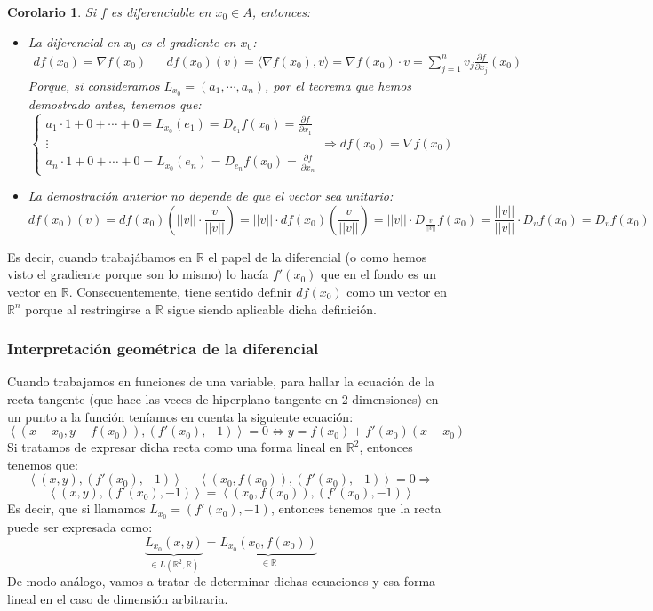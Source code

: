\documentclass[10pt,a4paper,openright]{book}
\theoremstyle{break}
\newtheorem*{coro}{Corolario}
\begin{document}
\begin{coro}
Si $f$ es diferenciable en $x_0\in A$, entonces:
\begin{itemize}
\item La diferencial en $x_0$ es el gradiente en $x_0$:
	\begin{align*}
df(x_0) = \nabla f(x_0)& & df(x_0)(v) = \langle \nabla f(x_0), v\rangle = \nabla f(x_0) \cdot v = \sum_{j = 1}^{n}v_j \frac{\partial f}{\partial x_j}(x_0)
	\end{align*}
	Porque,  si consideramos $L_{x_0} = (a_1, \cdots , a_n)$, por el teorema que hemos demostrado antes, tenemos que:
	$$\begin{cases} a_1 \cdot 1 + 0 + \cdots + 0 = L_{x_0}(e_1)= D_{e_1} f(x_0) = \frac{\partial f}{\partial x_1} \\ \vdots \\ a_n \cdot 1 + 0 + \cdots + 0 = L_{x_0}(e_n)= D_{e_n} f(x_0) = \frac{\partial f}{\partial x_n} \end{cases} \Rightarrow df(x_0) = \nabla f(x_0)$$
		
\item La demostración anterior no depende de que el vector sea unitario:
$$df(x_0)(v) = df(x_0)\left(||v|| \cdot \frac{v}{||v||}\right) = ||v|| \cdot df(x_0)\left(\frac{v}{||v||}\right) = ||v|| \cdot D_{\frac{v}{||v||}}f(x_0) = \frac{||v||}{||v||}\cdot D_v f(x_0)= D_v f(x_0)$$
\end{itemize}
\end{coro}
Es decir, cuando trabajábamos en $\mathbb{R}$ el papel de la diferencial (o como hemos visto el gradiente porque son lo mismo) lo hacía $f'(x_0)$ que en el fondo es un vector en $\mathbb{R}$. Consecuentemente, tiene sentido definir $df(x_0)$ como un vector en $\mathbb{R}^n$ porque al restringirse a $\mathbb{R}$ sigue siendo aplicable dicha definición.

\subsubsection{Interpretación geométrica de la diferencial}
Cuando trabajamos en funciones de una variable, para hallar la ecuación de la recta tangente (que hace las veces de hiperplano tangente en 2 dimensiones) en un punto a la función teníamos en cuenta la siguiente ecuación:
$$\left\langle (x-x_0, y-f(x_0)), (f'(x_0), -1)\right\rangle = 0 \Leftrightarrow y = f(x_0)+f'(x_0)(x-x_0)$$
Si tratamos de expresar dicha recta como una forma lineal en $\mathbb{R}^2$, entonces tenemos que:
$$\left\langle (x,y), (f'(x_0), -1)\right\rangle - \left\langle (x_0, f(x_0)), (f'(x_0), -1)\right\rangle = 0 \Rightarrow$$
$$\left\langle (x,y), (f'(x_0), -1)\right\rangle = \left\langle (x_0, f(x_0)), (f'(x_0), -1)\right\rangle$$
Es decir, que si llamamos $L_{x_0} = (f'(x_0), -1)$, entonces tenemos que la recta puede ser expresada como:
$$\underbrace{L_{x_0}(x,y)}_{\in L(\mathbb{R}^2, \mathbb{R})} = \underbrace{L_{x_0}(x_0, f(x_0))}_{\in \mathbb{R}}$$
De modo análogo, vamos a tratar de determinar dichas ecuaciones y esa forma lineal en el caso de dimensión arbitraria.
\end{document}
